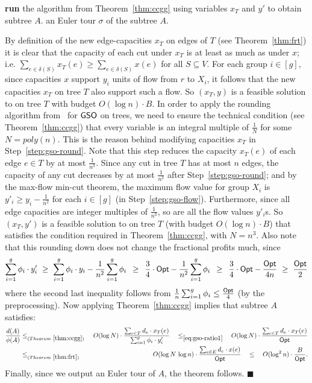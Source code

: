 \documentclass[11pt]{article}
\def\sse{\subseteq}
\def\opt{{\sf Opt}\xspace}
\newcommand{\profit}{\phi}
\def\gso{\ensuremath{{\sf GSO}}\xspace}
\newenvironment{pf}{

\noindent{\bf Proof:}} {\hfill$\blacksquare$


}
\begin{document}
\begin{pf}
\begin{algorithm}[!h]
\begin{algorithmic}[1]
    \STATE \label{step:gso-density} {\bf run} the algorithm from Theorem~\ref{thm:ccgg} using variables $x_T$ and $y'$ to obtain subtree $A$. 
     an Euler tour $\sigma$ of the subtree $A$.
  \end{algorithmic}
\end{algorithm}

By definition of the new edge-capacities $x_T$ on edges of $T$ (see Theorem~\ref{thm:frt}) it is clear that the capacity of each cut under $x_T$ is at least as much as under $x$; i.e. $\sum_{e\in \delta(S)} x_T(e)\ge 
\sum_{e\in \delta(S)} x(e)$ for all $S\sse V$.
For each group $i\in [g]$, since  capacities $x$ support $y_i$ units of flow from $r$ to $X_i$, it follows that the new capacities $x_T$ on tree $T$ also support such a flow. So $(x_T,y)$ is a feasible solution to \lpgo on tree $T$ with budget $O(\log n)\cdot B$.  
In order to apply the rounding algorithm from~\cite{ccgg} for \gso on trees, we need to ensure the technical condition (see Theorem~\ref{thm:ccgg}) that every variable is an integral multiple of $\frac1N$ for some $N=poly(n)$. This is the reason behind modifying capacities $x_T$ in Step~\ref{step:gso-round}. Note that this step reduces the capacity $x_T(e)$ of each edge $e\in T$ by at most   $\frac1{n^3}$. Since any cut in tree $T$ has at most $n$ edges,
  the capacity of any cut decreases by at most $\frac1{n^2}$ after
  Step~\ref{step:gso-round}; and by the max-flow min-cut theorem,
  the maximum flow value for group $X_i$ is $y'_i\ge y_i-\frac1{n^2}$ for each $i\in [g]$ (in
  Step~\ref{step:gso-flow}). Furthermore, since all edge capacities are
  integer multiples of $\frac1{n^3}$, so are all the flow values 
  $y'_i$s.  
  So $(x_T,y')$ is a feasible solution to \lpgo on tree $T$ (with budget $O(\log n)\cdot B$) that satisfies the condition required in Theorem~\ref{thm:ccgg}, with $N=n^3$.  
Also note  that this rounding down does not change the fractional profits much,  since
  \begin{equation}
    \label{eq:gso-ratio1}
    \sum_{i=1}^g  \profit_i\cdot y'_i \,\, \ge   \,\, \sum_{i=1}^g
     \profit_i\cdot y_i - \frac{1}{n^2}\sum_{i=1}^g
     \profit_i  \,\,\, \ge  \,\,\, \frac34\cdot \opt - \frac{1}{n^2}\sum_{i=1}^g
    \profit_i  \,\,\, \ge  \,\,\, \frac34\cdot \opt - \frac{\opt}{4n}\,\,\ge \,\,\frac{\opt}{2}
  \end{equation}
where the second last inequality follows from $\frac1n \sum_{i=1}^g  \profit_i \le \frac{\opt}4$ (by the preprocessing). Now applying Theorem~\ref{thm:ccgg} implies that subtree $A$ satisfies:
\begin{eqnarray*}\frac{d(A)}{\profit(A)} &\le_{(Theorem~\ref{thm:ccgg})} & \,\, O(\log N)\cdot \frac{\sum_{e\in T} d_e\cdot x_T(e)}{\sum_{i=1}^g \profit_i\cdot y'_i}\quad \le_{\eqref{eq:gso-ratio1}} \quad O(\log N)\cdot \frac{\sum_{e\in T} d_e\cdot x_T(e)}{\opt}\\
&\le_{(Theorem~\ref{thm:frt})} \,\, & O(\log N\,\log n)\cdot \frac{\sum_{e\in E} d_e\cdot x(e)}{\opt}\quad \le \quad O(\log^2n)\cdot \frac{B}{\opt}.\end{eqnarray*}
Finally, since we output an Euler tour of $A$, the theorem follows.
\end{pf}
\medskip
\end{document}

